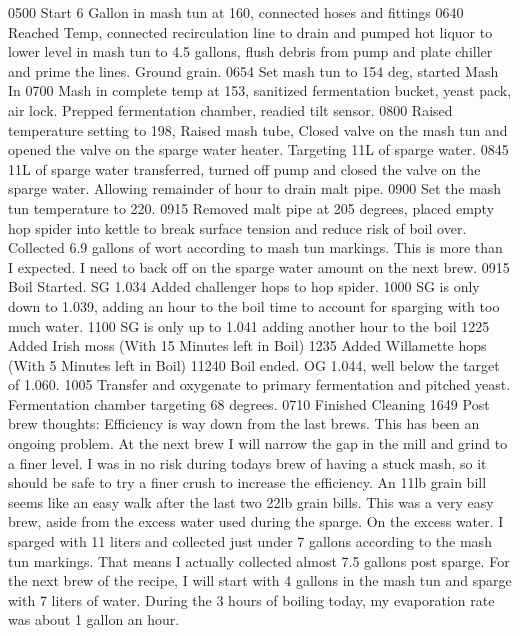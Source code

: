 0500 Start 6 Gallon in mash tun at 160, connected hoses and fittings
0640 Reached Temp, connected recirculation line to drain and pumped hot liquor to lower level in mash tun to 4.5 gallons, flush debris from pump and plate chiller and prime the lines.  Ground grain.
0654 Set mash tun to 154 deg, started Mash In
0700 Mash in complete temp at 153, sanitized fermentation bucket, yeast pack, air lock.  Prepped fermentation chamber, readied tilt sensor.
0800 Raised temperature setting to 198, Raised mash tube, Closed valve on the mash tun and opened the valve on the sparge water heater.  Targeting 11L of sparge water.
0845 11L of sparge water transferred, turned off pump and closed the valve on the sparge water.  Allowing remainder of hour to drain malt pipe.
0900 Set the mash tun temperature to 220.
0915 Removed malt pipe at 205 degrees, placed empty hop spider into kettle to break surface tension and reduce risk of boil over.  Collected 6.9 gallons of wort according to mash tun markings.  This is more than I expected.  I need to back off on the sparge water amount on the next brew.
0915 Boil Started. SG 1.034 Added challenger hops to hop spider.
1000 SG is only down to 1.039, adding an hour to the boil time to account for sparging with too much water.
1100 SG is only up to 1.041 adding another hour to the boil
1225 Added Irish moss (With 15 Minutes left in Boil)
1235 Added Willamette hops (With 5 Minutes left in Boil)
11240 Boil ended. OG 1.044, well below the target of 1.060.
1005 Transfer and oxygenate to primary fermentation and pitched yeast.  Fermentation chamber targeting 68 degrees.
0710 Finished Cleaning
1649 Post brew thoughts:  Efficiency is way down from the last brews.  This has been an ongoing problem.  At the next brew I will narrow the gap in the mill and grind to a finer level.  I was in no risk during todays brew of having a stuck mash, so it should be safe to try a finer crush to increase the efficiency.  An 11lb grain bill seems like an easy walk after the last two 22lb grain bills.  This was a very easy brew, aside from the excess water used during the sparge.  On the excess water.  I sparged with 11 liters and collected just under 7 gallons according to the mash tun markings.  That means I actually collected almost 7.5 gallons post sparge.  For the next brew of the recipe, I will start with 4 gallons in the mash tun and sparge with 7 liters of water.  During the 3 hours of boiling today, my evaporation rate was about 1 gallon an hour.
